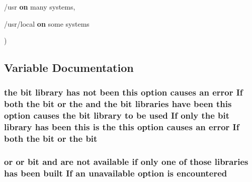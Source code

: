 {\begin{DoxyParamCaption}
\item[{/usr {\bf on} many}]{systems, }
\item[{/usr/local {\bf on} some}]{systems}
\end{DoxyParamCaption}
)}\hypertarget{pcre-config_8txt_a18dc282e6f9a58ef09af335a2d2ddf0e}{}\label{pcre-config_8txt_a18dc282e6f9a58ef09af335a2d2ddf0e}


\subsection{Variable Documentation}
\subsubsection[{\texorpdfstring{bit}{bit}}]{ the bit {\bf library} has {\bf not} been {\bf this} {\bf option} causes an {\bf error} If both the bit {\bf or} the and the bit {\bf libraries} have been {\bf this} {\bf option} causes the bit {\bf library} {\bf to} {\bf be} {\bf used} If only the bit {\bf library} has been {\bf this} {\bf is} the {\bf this} {\bf option} causes an {\bf error} If both the bit {\bf or} the bit}\hypertarget{pcre-config_8txt_aeddb586b79a44fb202dde924852cbbf6}{}\label{pcre-config_8txt_aeddb586b79a44fb202dde924852cbbf6}
\subsubsection[{\texorpdfstring{encountered}{encountered}}]{ {\bf or} {\bf or} {\bf bit} and {\bf are} {\bf not} {\bf available} {\bf if} only one {\bf of} those {\bf libraries} has been {\bf built} If an unavailable {\bf option} {\bf is} encountered}\hypertarget{pcre-config_8txt_ad131c8125f6c9158692263842c7bcbf3}{}\label{pcre-config_8txt_ad131c8125f6c9158692263842c7bcbf3}
